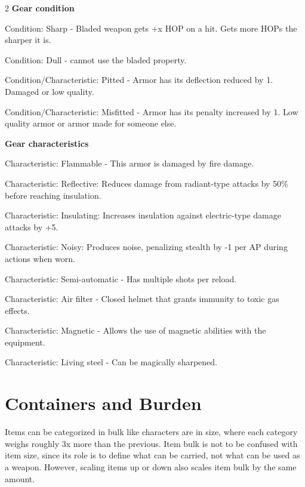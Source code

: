 \begin{multicols}{2}
\textbf{Gear condition}
\begin{proplist}
    \item Condition: Sharp - Bladed weapon gets +x HOP on a hit. Gets more HOPs the sharper it is. 
    \item Condition: Dull - cannot use the bladed property.
    \item Condition/Characteristic: Pitted - Armor has its deflection reduced by 1. Damaged or low quality.
    \item Condition/Characteristic: Misfitted - Armor has its penalty increased by 1. Low quality armor or armor made for someone else.
\end{proplist}

\textbf{Gear characteristics}
\begin{proplist}
    \item Characteristic: Flammable - This armor is damaged by fire damage.
    \item Characteristic: Reflective: Reduces damage from radiant-type attacks by 50\% before reaching insulation.
    \item Characteristic: Insulating: Increases insulation against electric-type damage attacks by +5.
    \item Characteristic: Noisy: Produces noise, penalizing stealth by -1 per AP during actions when worn.
   
    \item Characteristic: Semi-automatic - Has multiple shots per reload.
    \item Characteristic: Air filter - Closed helmet that grants immunity to toxic gas effects.
    \item \magic Characteristic: Magnetic - Allows the use of magnetic abilities with the equipment.
    \item \magic Characteristic: Living steel - Can be magically sharpened.
\end{proplist}


\section{Containers and Burden}

Items can be categorized in bulk like characters are in size, where each category weighs roughly 3x more than the previous. Item bulk is not to be confused with item size, since its role is to define what can be carried, not what can be used as a weapon. However, scaling items up or down also scales item bulk by the same amount.


\end{multicols}
